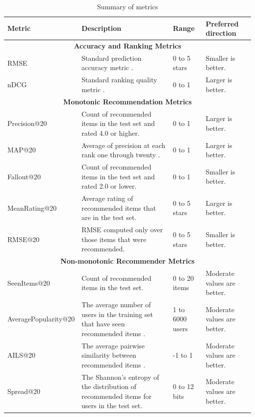 \documentclass[letterpaper]{sig-alternate}
\begin{document}
  \begin{table}[ht!]
    \centering
    \begin{tabular}{|p{7.5em}|p{21em}|p{7em}|p{12.5em}|}
      \hline
      Metric & Description & Range & Preferred direction\\\hline
      \hline
      \multicolumn{4}{|c|}{{\bf Accuracy and Ranking Metrics}} \\\hline
      RMSE                   & Standard prediction accuracy metric \cite{handbook}. & 0 to 5 stars & Smaller is better. \\\hline
      nDCG                   & Standard ranking quality metric \cite{handbook}.     & 0 to 1       & Larger is better.  \\\hline
      \hline
      \multicolumn{4}{|c|}{{\bf Monotonic Recommendation Metrics}} \\\hline
      Precision@20           & Count of recommended items in the test set and rated 4.0 or higher\footnotemark[1] \cite{handbook}. & 0 to 1       & Larger is better.  \\\hline
      MAP@20                 & Average of precision at each rank one through twenty \cite{manning2008introduction}.                & 0 to 1       & Larger is better.  \\\hline
      Fallout@20             & Count of recommended items in the test set and rated 2.0 or lower\footnotemark[1] \cite{handbook}.  & 0 to 1       & Smaller is better. \\\hline
      MeanRating@20          & Average rating of recommended items that are in the test set.                                       & 0 to 5 stars & Larger is better.  \\\hline
      RMSE@20                & RMSE computed only over those items that were recommended.                                          & 0 to 5 stars & Smaller is better. \\\hline
      \hline
      \multicolumn{4}{|c|}{{\bf Non-monotonic Recommender Metrics}} \\\hline
      SeenItems@20           & Count of recommended items in the test set. & 0 to 20 items & Moderate values are better. \\\hline
      Average\-Popularity@20 & The average number of users in the training set that have seen recommended items \cite{zieglerDiversity}.& 1 to 6000 users & Moderate values are better. \\\hline
      AILS@20                & The average pairwise similarity between recommended items \cite{zieglerDiversity}.                       & -1 to 1         & Moderate values are better. \\\hline
      Spread@20              & The Shannon's entropy of the distribution of recommended items for users in the test set.                & 0 to 12 bits    & Moderate values are better. \\\hline
    \end{tabular}
    \caption{Summary of metrics}
    \label{tbl:metrics}
  \end{table}
\end{document}
